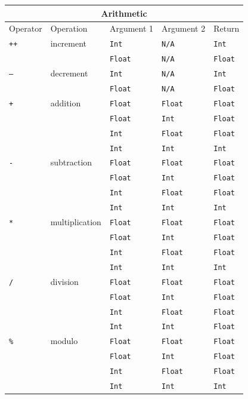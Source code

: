 \documentclass{article}
\newcommand{\type}[1]{\texttt{#1}}
\newcommand{\expr}[1]{\texttt{#1}}
\begin{document}
\begin{center}
\begin{tabular}{| l | l | l | l | l |}
	\hline
	\multicolumn{5}{|c|}{Arithmetic} \\ \hline
	Operator & Operation & Argument 1 & Argument 2 & Return \\ \hline
	\expr{++}& increment & \type{Int} & \type{N/A} & \type{Int}\\
	& & \type{Float} & \type{N/A} & \type{Float}\\
	\expr{--} & decrement & \type{Int} & \type{N/A} & \type{Int}\\
	& & \type{Float} & \type{N/A} & \type{Float}\\
	\expr{+} & addition & \type{Float} & \type{Float} & \type{Float} \\
	& & \type{Float} & \type{Int} & \type{Float} \\
	& & \type{Int} & \type{Float} & \type{Float} \\
	& & \type{Int} & \type{Int} & \type{Int} \\
	\expr{-} & subtraction & \type{Float} & \type{Float} & \type{Float} \\
	& & \type{Float} & \type{Int} & \type{Float} \\
	& & \type{Int} & \type{Float} & \type{Float} \\
	& & \type{Int} & \type{Int} & \type{Int} \\
	\expr{*} & multiplication & \type{Float} & \type{Float} & \type{Float} \\
	& & \type{Float} & \type{Int} & \type{Float} \\
	& & \type{Int} & \type{Float} & \type{Float} \\
	& & \type{Int} & \type{Int} & \type{Int} \\	
	\expr{/} & division & \type{Float} & \type{Float} & \type{Float} \\
	& & \type{Float} & \type{Int} & \type{Float} \\
	& & \type{Int} & \type{Float} & \type{Float} \\
	& & \type{Int} & \type{Int} & \type{Float} \\
	\expr{\%} & modulo & \type{Float} & \type{Float} & \type{Float} \\
	& & \type{Float} & \type{Int} & \type{Float} \\
	& & \type{Int} & \type{Float} & \type{Float} \\
	& & \type{Int} & \type{Int} & \type{Int} \\	 \hline

\end{tabular}
\end{center}
\end{document}
